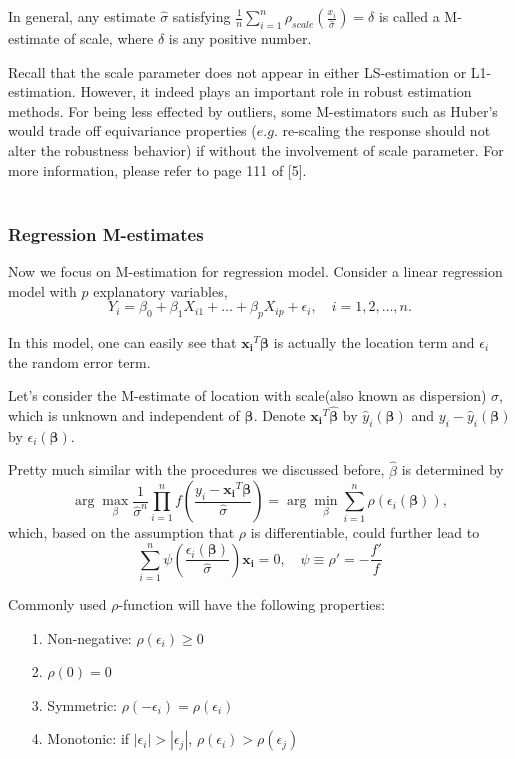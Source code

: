 \documentclass[conference]{IEEEtran}
\begin{document}
In general, any estimate $\hat{\sigma}$ satisfying $\frac{1}{n} \sum_{i=1}^{n} \rho_{scale}(\frac{x_i}{\hat{\sigma}}) = \delta$ is called a M-estimate of scale, where $\delta$ is any positive number.

Recall that the scale parameter does not appear in either LS-estimation or L1-estimation. However, it indeed plays an important role in robust estimation methods. For being less effected by outliers, some M-estimators such as Huber's would trade off equivariance properties ($e.g.$ re-scaling the response should not alter the robustness behavior) if without the involvement of scale parameter. For more information, please refer to page 111 of [5].\\~

\subsubsection{Regression M-estimates}
Now we focus on M-estimation for regression model. Consider a linear regression model with $p$ explanatory variables,
$$Y_{i}=\beta_{0}+\beta_{1}X_{i1}+\ldots+\beta_{p}X_{ip}+\epsilon_{i},\quad i=1,2,\ldots,n.$$

In this model, one can easily see that $\mathbold{x_i}^T \mathbold{\beta}$ is actually the location term and $\epsilon_{i}$ the random error term.

Let's consider the M-estimate of location with scale(also known as dispersion) $\sigma$, which is unknown and independent of $\mathbold{\beta}$. Denote $\mathbold{x_i}^T \mathbold{\hat{\beta}}$ by $\hat{y}_i(\mathbold{\beta})$ and $y_i - \hat{y}_i(\mathbold{\beta})$ by $\epsilon_i(\mathbold{\beta})$.


Pretty much similar with the procedures we discussed before, $\hat{\beta}$ is determined by 
$$\arg \max_{\beta} \frac{1}{\hat{\sigma}^n} \prod_{i=1}^{n} f(\frac{y_i - \mathbold{x_i}^T \mathbold{\beta}}{\hat{\sigma}}) = \arg \min_{\beta} \sum_{i=1}^{n} \rho( \epsilon_{i}(\mathbold{\beta})),$$
\noindent which, based on the assumption that $\rho$ is differentiable, could further lead to
$$\sum_{i=1}^{n} \psi(\frac{\epsilon_i(\mathbold{\beta})}{\hat{\sigma}}) \mathbold{x_i} = 0, \quad \psi \equiv \rho' = -\frac{f'}{f}$$

Commonly used $\rho$-function will have the following properties:
\begin{itemize}
    \item[1.] Non-negative: $\rho(\epsilon_{i})\geq0$
    \item[2.] $\rho(0) = 0$
    \item[3.] Symmetric: $\rho(-\epsilon_i) = \rho(\epsilon_i)$
    \item[4.] Monotonic: if $\left|\epsilon_i\right| > \left|\epsilon_j\right|$, $\rho(\epsilon_i) > \rho(\epsilon_j)$
\end{itemize} \\~
\end{document}
